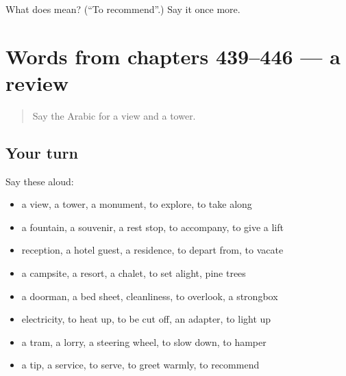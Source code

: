 \begin{tcolorbox}[breakable,colback=teal!4,colframe=teal!35!black,title={Before you move on}]
What does  mean? (\textquotedblleft{}To recommend\textquotedblright{}.) Say it once more.
\end{tcolorbox}
\section[(dialogue)]{Words from chapters 439–446 — a review}

\label{lesson:AR-R446-review-439-446}



\begin{quote}
Say the Arabic for a view and a tower.
\end{quote}

\subsection*{Your turn}
Say these aloud:

\begin{itemize}
\raggedright
  \item a view, a tower, a monument, to explore, to take along
  \item a fountain, a souvenir, a rest stop, to accompany, to give a lift
  \item reception, a hotel guest, a residence, to depart from, to vacate
  \item a campsite, a resort, a chalet, to set alight, pine trees
  \item a doorman, a bed sheet, cleanliness, to overlook, a strongbox
  \item electricity, to heat up, to be cut off, an adapter, to light up
  \item a tram, a lorry, a steering wheel, to slow down, to hamper
  \item a tip, a service, to serve, to greet warmly, to recommend
\end{itemize}

